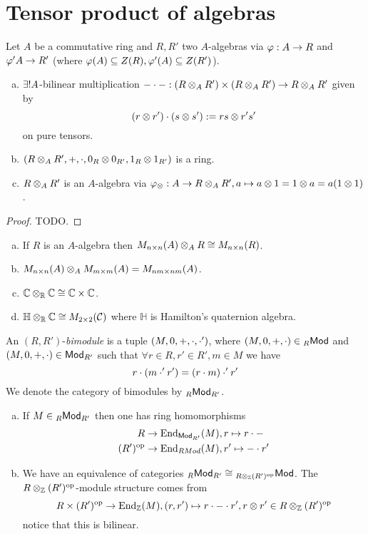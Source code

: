 \documentclass[a4paper]{report}
\begin{document}
\section{Tensor product of algebras}
Let $A$ be a commutative ring and $R, R'$ two $A$-algebras via $\varphi: A \to R$ and $\varphi' A \to R'$ (where $\varphi(A) \subseteq Z(R), \varphi'(A) \subseteq Z(R')$).
\begin{prop}
  \begin{enumerate}[(a)]
    \item $\exists! A$-bilinear multiplication $- \cdot -: (R \otimes_{A} R') \times (R \otimes_{A} R') \to R \otimes_{A} R'$ given by \[(r \otimes r') \cdot (s \otimes s') := rs \otimes r's'\]on pure tensors.
    \item $(R \otimes_{A} R', +, \cdot, 0_{R} \otimes 0_{R'}, 1_{R} \otimes 1_{R'})$ is a ring.
          \item $R \otimes_{A} R'$ is an $A$-algebra via $\varphi_{\otimes}: A \to R \otimes_{A}R', a \mapsto a \otimes 1 = 1 \otimes a = a(1 \otimes 1)$.
  \end{enumerate}
\begin{proof}
TODO.
\end{proof}
\end{prop}

\begin{exmps*}
\begin{enumerate}[(a)]
  \item If $R$ is an $A$-algebra then $M_{n \times n}(A) \otimes_{A} R \cong M_{n \times n}(R)$.
  \item $M_{n \times n}(A) \otimes_{A} M_{m \times m}(A) = M_{nm \times nm}(A)$.
  \item $\mathbb C \otimes_{\mathbb{R}} \mathbb C \cong \mathbb C \times \mathbb C$.
\item $\mathbb H \otimes_{\mathbb{R}} \mathbb C \cong M_{2 \times 2}(\mathcal{C})$ where $\mathbb H$ is Hamilton's quaternion algebra.
\end{enumerate}

\end{exmps*}


\begin{defi}
  An $(R,R')$-\emph{bimodule} is a tuple $(M, 0, +, \cdot, \cdot')$, where $(M, 0, +, \cdot) \in {}_R\mathsf{Mod}$ and $(M, 0, +, \cdot) \in \mathsf{Mod}_{R'}$ such that $\forall r \in R, r' \in R', m \in M$ we have \[r\cdot(m\cdot' r') = (r \cdot m)\cdot' r'\]
  We denote the category of bimodules by ${}_R\mathsf{Mod}_{R'}$.
\end{defi}
\begin{rem*}
  \begin{enumerate}[(a)]
  \item If $M \in {}_R\mathsf{Mod}_{R'}$ then one has ring homomorphisms
  \begin{align*}
  R &\to \operatorname{End}_{\mathsf{Mod}_{R'}}(M), r \mapsto r \cdot - \\
  (R')^\mathrm{op} &\to \operatorname{End}_{RMod}(M), r' \mapsto - \cdot r'
  \end{align*}
    \item We have an equivalence of categories ${}_R\mathsf{Mod}_{R'} \cong {}_{R \otimes_{\mathbb{Z}}(R')^\mathrm{op}}\mathsf{Mod}$. The $R \otimes_{\mathbb{Z}}(R')^\mathrm{op}$-module structure comes from \[R \times (R')^\mathrm{op} \to \operatorname{End}_{\mathbb{Z}}(M), (r,r') \mapsto r \cdot - \cdot r', r \otimes r' \in R \otimes_{\mathbb{Z}}(R')^\mathrm{op}\]
          notice that this is bilinear.
  \end{enumerate}
\end{rem*}
\end{document}
